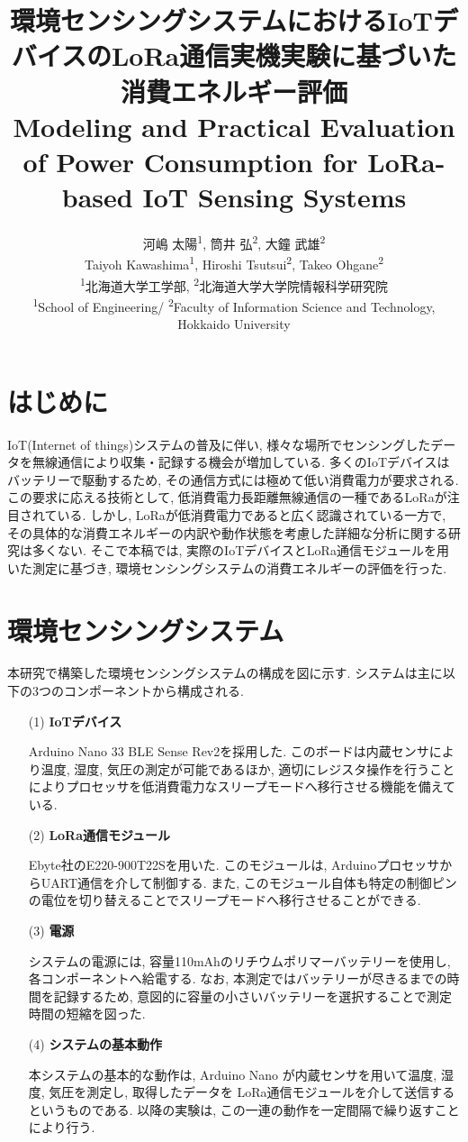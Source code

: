 \documentclass[lualatex, twocolumn]{ltjsarticle}
\title{{\bfseries 環境センシングシステムにおけるIoTデバイスのLoRa通信実機実験に基づいた消費エネルギー評価}\\
\large{Modeling and Practical Evaluation of Power Consumption for LoRa-based IoT Sensing Systems}}
\author{
    河嶋 太陽\textsuperscript{1},
    筒井 弘\textsuperscript{2},
    大鐘 武雄\textsuperscript{2}
    \\
    \normalsize
    Taiyoh Kawashima\textsuperscript{1},
    Hiroshi Tsutsui\textsuperscript{2},
    Takeo Ohgane\textsuperscript{2}
    \\
    \textsuperscript{1}北海道大学工学部,
    \textsuperscript{2}北海道大学大学院情報科学研究院
    \\
    \normalsize
    \textsuperscript{1}School of Engineering/ \textsuperscript{2}Faculty of Information Science and Technology, Hokkaido University
}
\date{}
\begin{document}
\maketitle


\section{はじめに}
 IoT(Internet of things)システムの普及に伴い, 様々な場所でセンシングしたデータを無線通信により収集・記録する機会が増加している. 
多くのIoTデバイスはバッテリーで駆動するため, その通信方式には極めて低い消費電力が要求される. 
この要求に応える技術として,  低消費電力長距離無線通信の一種であるLoRaが注目されている. 
しかし, LoRaが低消費電力であると広く認識されている一方で, その具体的な消費エネルギーの内訳や動作状態を考慮した詳細な分析に関する研究は多くない. 
そこで本稿では,  実際のIoTデバイスとLoRa通信モジュールを用いた測定に基づき, 環境センシングシステムの消費エネルギーの評価を行った. 


\section{環境センシングシステム}
 本研究で構築した環境センシングシステムの構成を図に示す. システムは主に以下の3つのコンポーネントから構成される.
\begin{enumerate}
    \item[(1)]\textbf{IoTデバイス}

    Arduino Nano 33 BLE Sense Rev2を採用した. このボードは内蔵センサにより温度, 湿度, 気圧の測定が可能であるほか, 
    適切にレジスタ操作を行うことによりプロセッサを低消費電力なスリープモードへ移行させる機能を備えている.

    \item[(2)]\textbf{LoRa通信モジュール}

    Ebyte社のE220-900T22Sを用いた. このモジュールは, ArduinoプロセッサからUART通信を介して制御する. 
    また, このモジュール自体も特定の制御ピンの電位を切り替えることでスリープモードへ移行させることができる. 

    \item[(3)]\textbf{電源}

    システムの電源には, 容量110mAhのリチウムポリマーバッテリーを使用し, 各コンポーネントへ給電する.
    なお, 本測定ではバッテリーが尽きるまでの時間を記録するため, 意図的に容量の小さいバッテリーを選択することで測定時間の短縮を図った.

    \item [(4)]\textbf{システムの基本動作}

    本システムの基本的な動作は, Arduino Nano が内蔵センサを用いて温度, 湿度, 気圧を測定し, 取得したデータを
    LoRa通信モジュールを介して送信するというものである. 
    以降の実験は, この一連の動作を一定間隔で繰り返すことにより行う. 
\end{enumerate}
\end{document}
